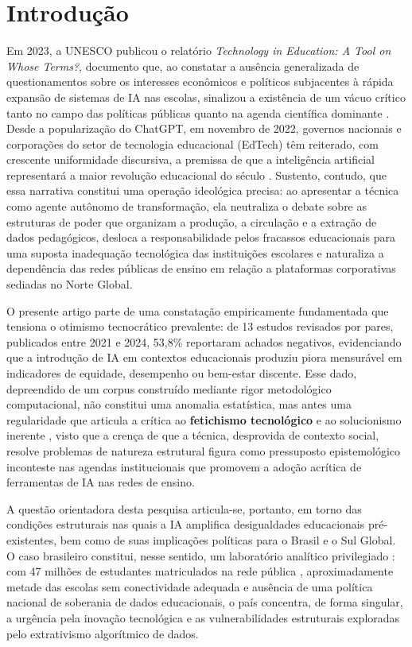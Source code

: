 \documentclass[preprint,12pt,authoryear]{elsarticle}
\begin{document}
\section{Introdução}

Em 2023, a UNESCO publicou o relatório \textit{Technology in
Education: A Tool on Whose Terms?}, documento que, ao constatar
a ausência generalizada de questionamentos sobre os interesses
econômicos e políticos subjacentes à rápida expansão de sistemas
de IA nas escolas, sinalizou a existência de um vácuo crítico
tanto no campo das políticas públicas quanto na agenda científica
dominante \citep{UNESCO2023}. Desde a popularização do ChatGPT,
em novembro de 2022, governos nacionais e corporações do setor de
tecnologia educacional (EdTech) têm reiterado, com crescente
uniformidade discursiva, a premissa de que a inteligência artificial
representará a maior revolução educacional do século
\citep{Holmes2022}. Sustento, contudo, que essa narrativa constitui
uma operação ideológica precisa: ao apresentar a técnica como agente
autônomo de transformação, ela neutraliza o debate sobre as estruturas
de poder que organizam a produção, a circulação e a extração de dados
pedagógicos, desloca a responsabilidade pelos fracassos educacionais
para uma suposta inadequação tecnológica das instituições escolares
e naturaliza a dependência das redes públicas de ensino em relação
a plataformas corporativas sediadas no Norte Global.

O presente artigo parte de uma constatação empiricamente fundamentada
que tensiona o otimismo tecnocrático prevalente: de 13 estudos
revisados por pares, publicados entre 2021 e 2024, 53,8\% reportaram
achados negativos, evidenciando que a introdução de IA em contextos
educacionais produziu piora mensurável em indicadores de equidade,
desempenho ou bem-estar discente. Esse dado, depreendido de um corpus
construído mediante rigor metodológico computacional, não constitui
uma anomalia estatística, mas antes uma regularidade que articula a
crítica ao \textbf{fetichismo tecnológico} e ao solucionismo inerente
\citep{Morozov2013}, visto que a crença de que a técnica, desprovida
de contexto social, resolve problemas de natureza estrutural figura
como pressuposto epistemológico inconteste nas agendas institucionais
que promovem a adoção acrítica de ferramentas de IA nas redes de ensino.

A questão orientadora desta pesquisa articula-se, portanto, em torno
das condições estruturais nas quais a IA amplifica desigualdades
educacionais pré-existentes, bem como de suas implicações políticas
para o Brasil e o Sul Global. O caso brasileiro constitui, nesse
sentido, um laboratório analítico privilegiado \citep{Yin2018}: com
47 milhões de estudantes matriculados na rede pública \citep{INEP2023},
aproximadamente metade das escolas sem conectividade adequada
\citep{CGIbr2023} e ausência de uma política nacional de soberania
de dados educacionais, o país concentra, de forma singular, a urgência
pela inovação tecnológica e as vulnerabilidades estruturais exploradas
pelo extrativismo algorítmico de dados.
\end{document}
